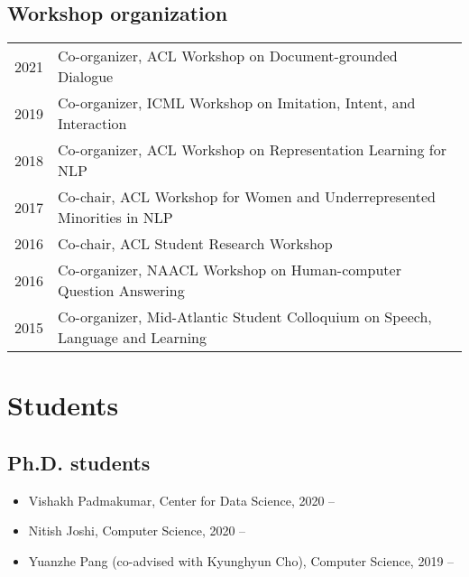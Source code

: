 \documentclass[a4paper,11pt]{article}
\begin{document}
\subsection{Workshop organization}
\begin{longtable}{rl}
2021 & Co-organizer, ACL Workshop on Document-grounded Dialogue \\
2019 & Co-organizer, ICML Workshop on Imitation, Intent, and Interaction \\
2018 & Co-organizer, ACL Workshop on Representation Learning for NLP \\
2017 & Co-chair, ACL Workshop for Women and Underrepresented Minorities in NLP \\
2016 & Co-chair, ACL Student Research Workshop \\
2016 & Co-organizer, NAACL Workshop on Human-computer Question Answering \\
2015 & Co-organizer, Mid-Atlantic Student Colloquium on Speech, Language and Learning
\end{longtable}

\section{Students}
\subsection{Ph.D. students}
\begin{itemize}
    \item Vishakh Padmakumar, Center for Data Science, 2020 --
    \item Nitish Joshi, Computer Science, 2020 --
    \item Yuanzhe Pang (co-advised with Kyunghyun Cho), Computer Science, 2019 --
\end{itemize}
\end{document}
